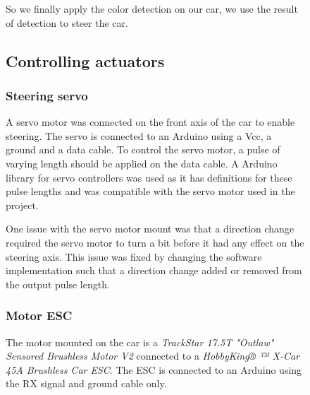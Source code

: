 \documentclass[11pt, titlepage]{article} %
\begin{document}
\begin{figure}
So we finally apply the color detection on our car, we use the result of detection to steer the car.

\subsection{Controlling actuators}
\subsubsection{Steering servo}
A servo motor was connected on the front axis of the car to enable steering. The servo is connected to an Arduino using a Vcc, a ground and a data cable. To control the servo motor, a pulse of varying length should be applied on the data cable. A Arduino library for servo controllers was used as it has definitions for these pulse lengths and was compatible with the servo motor used in the project.

One issue with the servo motor mount was that a direction change required the servo motor to turn a bit before it had any effect on the steering axis. This issue was fixed by changing the software implementation such that a direction change added or removed from the output pulse length.

\subsubsection{Motor ESC}
The motor mounted on the car is a \textit{TrackStar 17.5T "Outlaw" Sensored Brushless Motor V2} connected to a \textit{HobbyKing® ™ X-Car 45A Brushless Car ESC}. The ESC is connected to an Arduino using the RX signal and ground cable only.


\end{figure}
\end{document}
